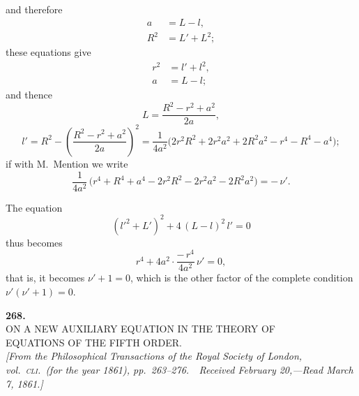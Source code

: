 \documentclass[11pt]{article}
\begin{document}
\medskip

\noindent and therefore
\[
\begin{aligned}
   a &= L - l,\\
   R^2 &= L' + L^2;
\end{aligned}
\]
these equations give
\[
\begin{aligned}
   r^2 &= l' + l^2,\\
   a &= L - l;
\end{aligned}
\]
and thence
\[
   L = \frac{R^2 - r^2 + a^2}{2a},
\]
\[
   l' = R^2 - \left(\frac{R^2 - r^2 + a^2}{2a}\right)^2 = \frac{1}{4 a^2}\bigl(2 r^2 R^2 + 2 r^2 a^2 + 2 R^2 a^2 - r^4 - R^4 - a^4\bigr);
\]
if with M.~Mention we write
\[
   \frac{1}{4 a^2}\,\bigl(r^4 + R^4 + a^4 - 2 r^2 R^2 - 2 r^2 a^2 - 2 R^2 a^2\bigr) = -\,\nu'.
\]

\medskip

\noindent The equation
\[
   (l'^2 + L')^2 + 4\,(L - l)^2\,l' = 0
\]
thus becomes
\[
   r^4 + 4 a^2\cdot\frac{-\,r^4}{4 a^2}\,\nu' = 0,
\]
that is, it becomes $\nu' + 1 = 0$, which is the other factor of the complete condition $\nu'(\nu' + 1) = 0$.

\newpage
\setcounter{page}{309}


\begin{center}
\textbf{268.}\\[1em]
{\Large ON A NEW AUXILIARY EQUATION IN THE THEORY OF}\\[0.3em]
{\Large EQUATIONS OF THE FIFTH ORDER.}\\[1em]
\textit{[From the Philosophical Transactions of the Royal Society of London, vol.~\textsc{cli}.\ (for the year 1861), pp.~263--276.\ \ Received February 20,---Read March 7, 1861.]}
\end{center}

\medskip
\end{document}
